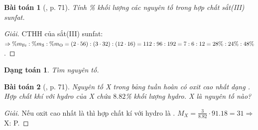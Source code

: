 \documentclass{article}
\newtheorem{baitoan}{Bài toán}
\newtheorem{dangtoan}{Dạng toán}
\begin{document}
\begin{baitoan}[\cite{Tuan2022}, p. 71]
	Tính \% khối lượng các nguyên tố trong hợp chất sắt(III) sunfat.
\end{baitoan}

\begin{proof}[Giải]
	CTHH của sắt(III) sunfat: $\Rightarrow\%m_{\ce{Fe}}:\%m_{\ce{S}}:\%m_{\ce{O}} = (2\cdot56):(3\cdot32):(12\cdot16) = 112:96:192 = 7:6:12 = 28\%:24\%:48\%$.
\end{proof}

\begin{dangtoan}
	Tìm nguyên tố.
\end{dangtoan}

\begin{baitoan}[\cite{Tuan2022}, p. 71]
	Nguyên tố X trong bảng tuần hoàn có oxit cao nhất dạng \emph{}. Hợp chất khí với hydro của X chứa $8.82$\% khối lượng hydro. X là nguyên tố nào?
\end{baitoan}

\begin{proof}[Giải]
	Nếu oxit cao nhất là  thì hợp chất kí với hydro là . $M_X = \frac{3}{8.82}\cdot91.18 = 31\Rightarrow$ X: P.
\end{proof}



\printbibliography[heading=bibintoc]
	
\end{document}
